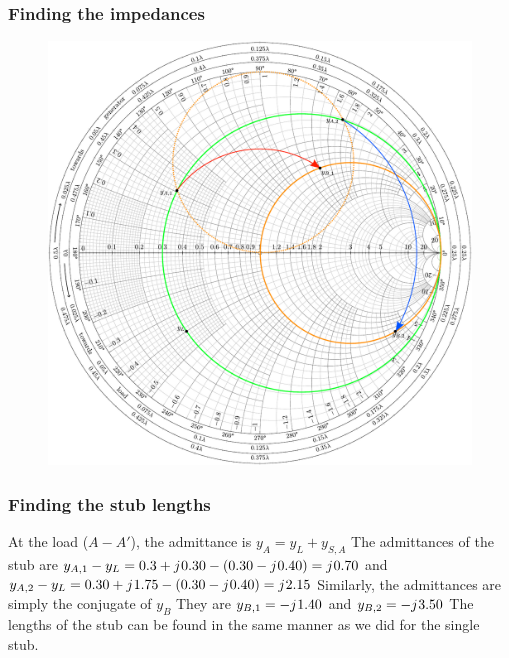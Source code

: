 \documentclass[10pt, compress]{beamer}
\renewcommand{\j}{{j}\mkern1mu} %
\begin{document}
\begin{frame}
    \frametitle{Finding the impedances}
    \begin{figure}[T!]
        \centering
        \includegraphics[width=.7\textwidth]{smith example double stub matching.pdf}
    \end{figure}
\end{frame}

\begin{frame}
    \frametitle{Finding the stub lengths}
    \begin{outline}
        \1 At the load ($A-A'$), the admittance is $y_A = y_L + y_{S,A}$
        \1 The admittances of the stub are $y_{A,1} - y_L  = 0.3 + \j 0.30 - (0.30 - \j 0.40) = \j 0.70$ and $y_{A,2} - y_L = 0.30 + \j 1.75 - (0.30 - \j 0.40) = \j 2.15$
        \1 Similarly, the admittances are simply the conjugate of $y_B$
        \1 They are $y_{B,1} = -\j 1.40$ and $y_{B,2} = -\j 3.50$
        \1 The lengths of the stub can be found in the same manner as we did for the single stub.
    \end{outline}



\end{frame}

\end{document}
